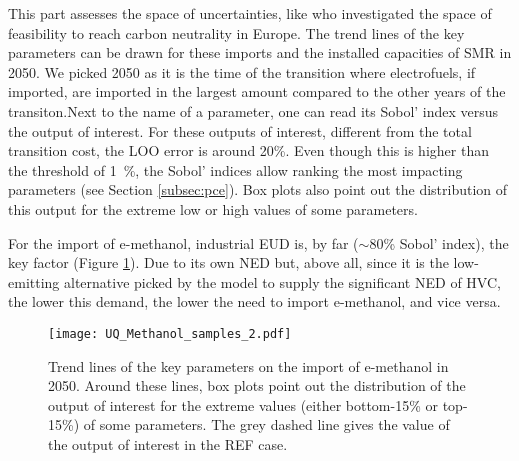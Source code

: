 This part assesses the space of uncertainties, like \citet{pickering2022diversity} who investigated the space of feasibility to reach carbon neutrality in Europe. The trend lines of the key parameters can be drawn for these imports and the installed capacities of \gls{SMR} in 2050. We picked 2050 as it is the time of the transition where electrofuels, if imported, are imported in the largest amount compared to the other years of the transiton.Next to the name of a parameter, one can read its Sobol' index versus the output of interest. For these outputs of interest, different from the total transition cost, the \gls{LOO} error is around 20\%. Even though this is higher than the threshold of \SI{1}{\%}, the Sobol' indices allow ranking the most impacting parameters (see Section \ref{subsec:pce}). Box plots also point out the distribution of this output for the extreme low or high values of some parameters.

For the import of e-methanol, industrial \gls{EUD} is, by far (\ie $\sim$80\% Sobol' index), the key factor (Figure \ref{fig:results_uq_samples_methanol}). Due to its own \gls{NED} but, above all, since it is the low-emitting alternative picked by the model to supply the significant \gls{NED} of \gls{HVC}, the lower this demand, the lower the need to import e-methanol, and vice versa. 

\begin{figure}[htbp!]
\centering
\texttt{[image: UQ\_Methanol\_samples\_2.pdf]}
\caption{Trend lines of the key parameters on the import of e-methanol in 2050. Around these lines, box plots point out the distribution of the output of interest for the extreme values (either bottom-15\% or top-15\%) of some parameters. The grey dashed line gives the value of the output of interest in the REF case. }
\label{fig:results_uq_samples_methanol}
\end{figure}

